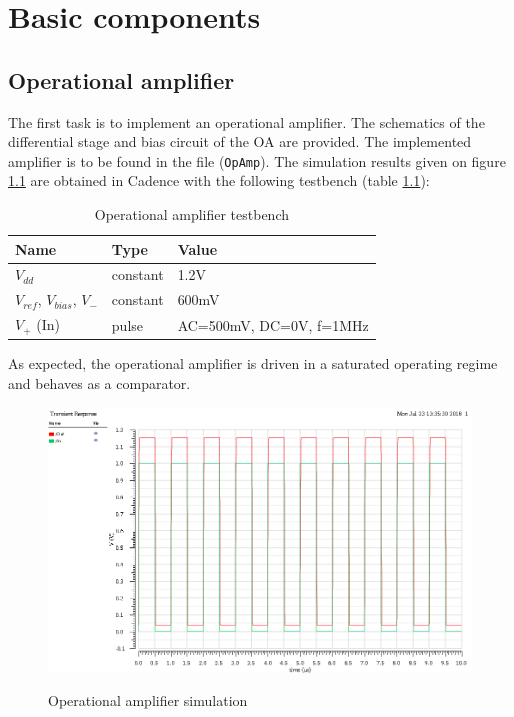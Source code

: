 \chapter{Basic components}
\section{Operational amplifier}

The first task is to implement an operational amplifier. The schematics of the differential stage and bias circuit of the OA are provided. The implemented amplifier is to be found in the file (\texttt{OpAmp}). The simulation results given on figure \ref{fig:opAmpSimulation} are obtained in Cadence with the following testbench (table \ref{table:opAmpTestbench}): 

\begin{table}[!h]
	\centering
	\begin{tabular}{|l|l|l|}
		\hline
		Name & Type & Value \\
		\hline
		$V_{dd}$ & constant & 1.2V \\
		$V_{ref}$, $V_{bias}$, $V_{-}$ & constant & 600mV \\
		$V_{+}$ (In) & pulse & AC=500mV, DC=0V, f=1MHz \\
		\hline
	\end{tabular}
	\label{table:opAmpTestbench}
	\caption{Operational amplifier testbench}
\end{table}

As expected, the operational amplifier is driven in a saturated operating regime and behaves as a comparator.

\begin{figure}[h]
	\centering
	\includegraphics[scale=0.65]{images/BasicComponents/Task1opAmpSimulation.png}
	\label{fig:opAmpSimulation}
	\caption{Operational amplifier simulation}
\end{figure} 

